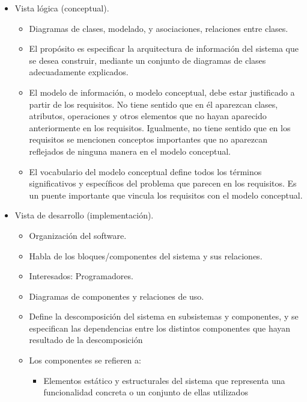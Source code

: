 \documentclass[12pt, twoside, openright]{report} %
\begin{document}
\begin{itemize}
	\item Vista lógica (conceptual).
	      \begin{itemize}
		      \item Diagramas de clases, modelado, y asociaciones, relaciones entre
		            clases.
		      \item El propósito es especificar la arquitectura de información del
		            sistema que se desea construir, mediante un conjunto de
		            diagramas de clases adecuadamente explicados.
		      \item El modelo de información, o modelo conceptual, debe estar
		            justificado a partir de los requisitos. No tiene sentido que en
		            él aparezcan clases, atributos, operaciones y otros elementos
		            que no hayan aparecido anteriormente en los requisitos.
		            Igualmente, no tiene sentido que en los requisitos se mencionen
		            conceptos importantes que no aparezcan reflejados de ninguna
		            manera en el modelo conceptual.
		      \item El vocabulario del modelo conceptual define todos los términos
		            significativos y específicos del problema que parecen en los
		            requisitos. Es un puente importante que vincula los requisitos
		            con el modelo conceptual.
	      \end{itemize}
	\item Vista de desarrollo (implementación).
	      \begin{itemize}
		      \item Organización del software.
		      \item Habla de los bloques/componentes del sistema y sus relaciones.
		      \item Interesados: Programadores.
		      \item Diagramas de componentes y relaciones de uso.
		      \item Define la descomposición del sistema en subsistemas y
		            componentes, y se especifican las dependencias entre los
		            distintos componentes que hayan resultado de la descomposición
		            \pagebreak
		      \item Los componentes se refieren a:
		            \begin{itemize}
			            \item Elementos estático y estructurales del sistema que representa
			                  una funcionalidad concreta o un conjunto de ellas utilizados

\end{itemize}
\end{itemize}
\end{itemize}
\end{document}
